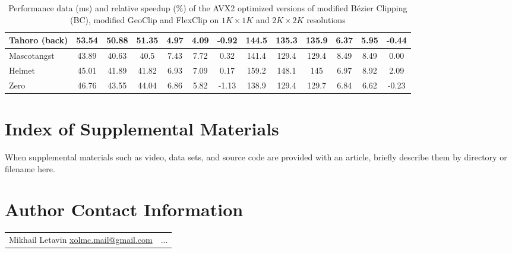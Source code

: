 \documentclass{jcgt}
\begin{document}
\begin{table}[h]
{\begin{tabular}{ | l | *{12}{c |} }
Tahoro (back) 	  & 53.54	& 50.88	& 51.35	& 4.97	& 4.09	& -0.92 & 144.5	& 135.3	& 135.9	& 6.37	& 5.95	& -0.44 \\ \hline
Mascotangst 	     & 43.89	& 40.63	& 40.5	& 7.43	& 7.72	& 0.32  & 141.4	& 129.4	& 129.4	& 8.49	& 8.49	& 0.00  \\ \hline
Helmet 	          & 45.01	& 41.89	& 41.82	& 6.93	& 7.09	& 0.17  & 159.2	& 148.1	& 145	   & 6.97	& 8.92	& 2.09  \\ \hline
Zero 	             & 46.76	& 43.55	& 44.04	& 6.86	& 5.82	& -1.13 & 138.9	& 129.4	& 129.7	& 6.84	& 6.62	& -0.23 \\
	\hline
	\end{tabular}}
	\caption{Performance data (ms) and relative speedup (\%) of the AVX2 optimized versions of modified Bézier Clipping (BC), modified GeoClip and FlexClip on $1K\times1K$ and $2K\times2K$ resolutions}
	\label{tbl:avx}
\end{table}

\section*{Index of Supplemental Materials}
When supplemental materials such as video, data sets, and source code are provided with an article, briefly describe them by directory or filename here.

\section*{Author Contact Information}

\hspace{-2mm}\begin{tabular}{p{}p{}}
Mikhail Letavin \newline
\href{mailto:xolmc.mail@gmail.com}{xolmc.mail@gmail.com}
&

...

\end{tabular}


\afterdoc
\end{document}
